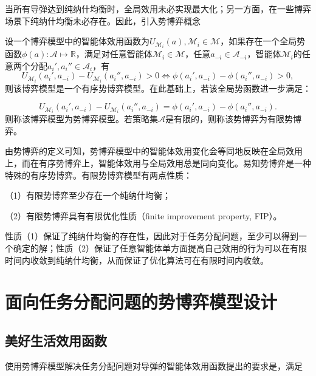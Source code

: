 当所有导弹达到纯纳什均衡时，全局效用未必实现最大化；另一方面，在一些博弈场景下纯纳什均衡未必存在。因此，引入势博弈概念

\begin{definition}[有序势博弈与势博弈]
\label{pg:def:potentialGame}
	设一个博弈模型中的智能体效用函数为$U_{\mathcal{M}_i}(a),\mathcal{M}_i\in \mathcal{M}$，如果存在一个全局势函数$\phi(a):\mathcal{A} \mapsto \mathbb{R}$，满足对任意智能体$\mathcal{M}_i \in \mathcal{M}$，任意$a_{-i}\in \mathcal{A}_{-i}$，智能体$\mathcal{M}_i$的任意两个分配$a_i',a_i''\in \mathcal{A}_i$，有
	\begin{equation}
	\label{pg:eq:ordpg}
		U_{\mathcal{M}_i}(a_i',a_{-i})-U_{\mathcal{M}_i}(a_i'',a_{-i})>0 \Leftrightarrow \phi(a_i',a_{-i})-\phi(a_i'',a_{-i})>0,
	\end{equation}
	则该博弈模型是一个有序势博弈模型。在此基础上，若该全局势函数进一步满足：
	
	\begin{equation}
	\label{pg:eq:pgdef}
		U_{\mathcal{M}_i}(a_i',a_{-i})-U_{\mathcal{M}_i}(a_i'',a_{-i})=\phi(a_i',a_{-i})-\phi(a_i'',a_{-i}).
	\end{equation}
	则称该博弈模型为势博弈模型。若策略集$\mathcal{A}$是有限的，则称该势博弈为有限势博弈。
\end{definition}

由势博弈的定义可知，势博弈模型中的智能体效用变化会等同地反映在全局效用上，而在有序势博弈上，智能体效用与全局效用总是同向变化。易知势博弈是一种特殊的有序势博弈。有限势博弈模型有两点性质：

（1）有限势博弈至少存在一个纯纳什均衡；

（2）有限势博弈具有有限优化性质（finite improvement property, FIP）。

性质（1）保证了纯纳什均衡的存在性，因此对于任务分配问题，至少可以得到一个确定的解；性质（2）保证了任意智能体单方面提高自己效用的行为可以在有限时间内收敛到纯纳什均衡，从而保证了优化算法可在有限时间内收敛。





\section{面向任务分配问题的势博弈模型设计}
\label{pg:agent_utility}

\subsection{美好生活效用函数}
\label{pg:wlu}
使用势博弈模型解决任务分配问题对导弹的智能体效用函数提出的要求是，满足

